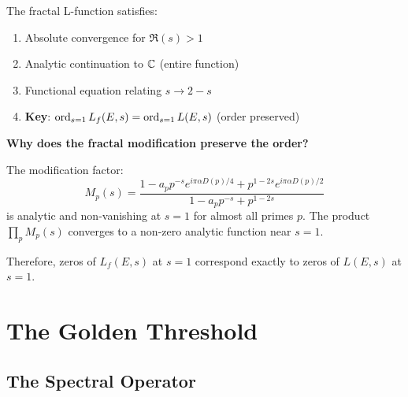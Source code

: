 \begin{proposition}[Properties of $L_f$]\label{prop:fractal-l-properties}
The fractal L-function satisfies:
\begin{enumerate}
\item Absolute convergence for $\Re(s) > 1$
\item Analytic continuation to $\mathbb{C}$ (entire function)
\item Functional equation relating $s \to 2-s$
\item \textbf{Key}: $\operatorname{ord}_{s=1} L_f(E,s) = \operatorname{ord}_{s=1} L(E,s)$ (order preserved)
\end{enumerate}
\end{proposition}

\begin{level3}
\textbf{Why does the fractal modification preserve the order?}

The modification factor:
\begin{equation}
M_p(s) = \frac{1 - a_p p^{-s} e^{i\pi\alpha D(p)/4} + p^{1-2s} e^{i\pi\alpha D(p)/2}}{1 - a_p p^{-s} + p^{1-2s}}
\end{equation}
is analytic and non-vanishing at $s = 1$ for almost all primes $p$. The product $\prod_p M_p(s)$ converges to a non-zero analytic function near $s = 1$.

Therefore, zeros of $L_f(E,s)$ at $s=1$ correspond exactly to zeros of $L(E,s)$ at $s=1$.
\end{level3}

\section{The Golden Threshold}

\subsection{The Spectral Operator}

